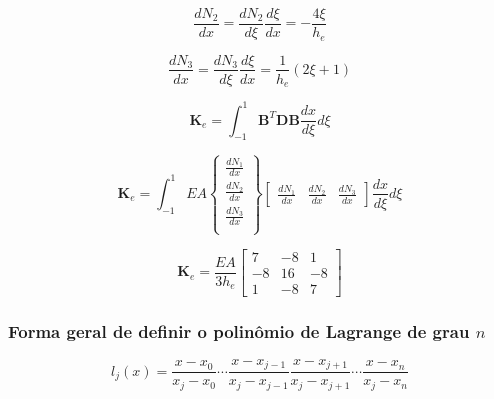         \begin{equation*}
            \frac{dN_2}{dx} = \frac{dN_2}{d\xi} \frac{d\xi}{dx} = -\frac{4\xi}{h_e}
        \end{equation*}

        \begin{equation*}
            \frac{dN_3}{dx} = \frac{dN_3}{d\xi} \frac{d\xi}{dx} = \frac{1}{h_e}\left(2\xi+1\right)
        \end{equation*}

        \begin{equation*}
            \mathbf{K}_e = \int_{-1}^{1} \mathbf{B}^T\mathbf{D}\mathbf{B} \frac{dx}{d\xi} d\xi
        \end{equation*}

        \begin{equation*}
            \mathbf{K}_e = \int_{-1}^{1} EA 
            \begin{Bmatrix}
            \frac{dN_1}{dx}\\
            \frac{dN_2}{dx}\\
            \frac{dN_3}{dx}\\
            \end{Bmatrix}
            \begin{bmatrix}
            \frac{dN_1}{dx} &
            \frac{dN_2}{dx} &
            \frac{dN_3}{dx}
            \end{bmatrix} \frac{dx}{d\xi} d\xi
        \end{equation*}


        \begin{equation*}
            \mathbf{K}_e = 
            \frac{EA}{3h_e}
            \begin{bmatrix}
                7 & -8 & 1 \\
                -8 & 16 & -8 \\
                1 & -8 & 7
            \end{bmatrix}
        \end{equation*}


        \subsubsection*{Forma geral de definir o polinômio de Lagrange de grau $n$}

        \begin{equation*}
            l_j(x) = \frac{x-x_0}{x_j-x_0} \cdots \frac{x-x_{j-1}}{x_j-x_{j-1}} \frac{x-x_{j+1}}{x_j-x_{j+1}} \cdots \frac{x-x_n}{x_j-x_n}
        \end{equation*}

